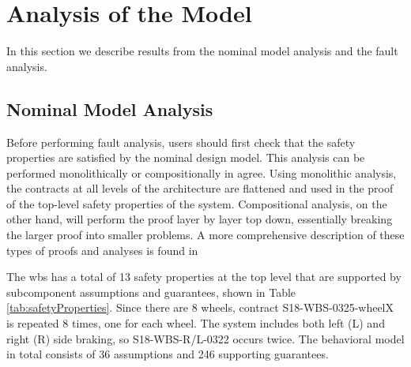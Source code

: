 \section{Analysis of the Model}
\label{sec:fault_analysis_2}
In this section we describe results from the nominal model analysis and the fault analysis.  

\subsection{Nominal Model Analysis}
\label{subsec:nominalAnalysis}
Before performing fault analysis, users should first check that the safety properties are satisfied by the nominal design model. This analysis can be performed monolithically or compositionally in \gls{agree}. Using monolithic analysis, the contracts at all levels of the architecture are flattened and used in the proof of the top-level safety properties of the system. Compositional analysis, on the other hand, will perform the proof layer by layer top down, essentially breaking the larger proof into smaller problems. A more comprehensive description of these types of proofs and analyses is found in~\cite{NFM2012:CoGaMiWhLaLu,QFCS15:backes} 

The \gls{wbs} has a total of 13 safety properties at the top level that are supported by subcomponent assumptions and guarantees, shown in Table \ref{tab:safetyProperties}. Since there are 8 wheels, contract S18-WBS-0325-wheelX is repeated 8 times, one for each wheel. The system includes both left (L) and right (R) side braking, so S18-WBS-R/L-0322 occurs twice. The behavioral model in total consists of 36 assumptions and 246 supporting guarantees.

